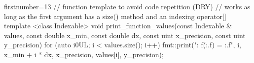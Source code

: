 \begin{cppcode*}{firstnumber=13}
// function template to avoid code repetition (DRY)
// works as long as the first argument has a size() method and an indexing operator[]
template <class Indexable> void print_function_values(const Indexable & values, const double x_min, const double dx, const uint x_precision, const uint y_precision) {
    for (auto i{0UL}; i < values.size(); i++) {
        fmt::print("{}: f({:.{}f}) = {:.{}f}\n", i, x_min + i * dx, x_precision, values[i], y_precision);
    }
}
\end{cppcode*}
